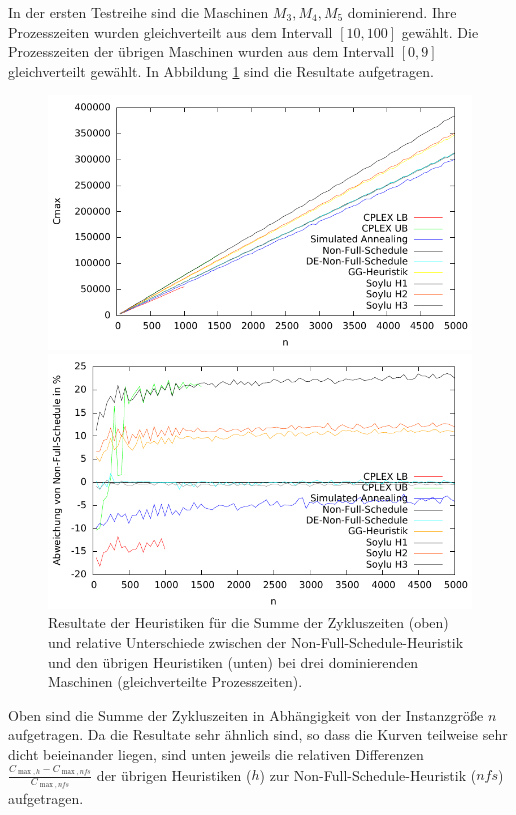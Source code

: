 \documentclass{scrreprt}
\begin{document}
In der ersten Testreihe sind die Maschinen $M_3,M_4,M_5$ dominierend.
Ihre Prozesszeiten wurden gleichverteilt aus dem Intervall $[10,100]$ gewählt.
Die Prozesszeiten der übrigen Maschinen wurden aus dem Intervall $[0,9]$ gleichverteilt gewählt.
In Abbildung \ref{abb:3dom} sind die Resultate aufgetragen.
\begin{figure}
    \begin{center}
        \includegraphics[width=.8\textwidth]{../instances/3dom/plot.pdf}
    \end{center}
    \begin{center}
        \includegraphics[width=.8\textwidth]{../instances/3dom/plotrel.pdf}
    \end{center}
    \caption{
        \label{abb:3dom}
        Resultate der Heuristiken für die Summe der Zykluszeiten (oben) 
        und relative Unterschiede zwischen der Non-Full-Schedule-Heuristik und den übrigen Heuristiken (unten) 
        bei drei dominierenden Maschinen (gleichverteilte Prozesszeiten).
    }
\end{figure}
Oben sind die Summe der Zykluszeiten in Abhängigkeit von der Instanzgröße $n$ aufgetragen.
Da die Resultate sehr ähnlich sind, so dass die Kurven teilweise sehr dicht beieinander liegen, 
sind unten jeweils die relativen Differenzen $\frac{C_{\max,h}-C_{\max,nfs}}{C_{\max,nfs}}$ der übrigen Heuristiken ($h$) zur Non-Full-Schedule-Heuristik ($nfs$) aufgetragen.
\end{document}
